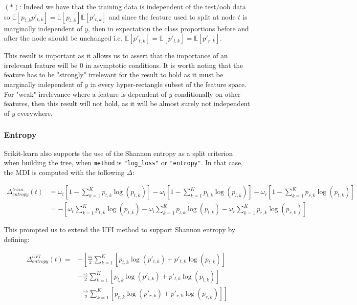 \documentclass{article}
\begin{document}
$(*)$: Indeed we have that the training data is independent of the test/oob data so $\mathbb{E}[p_{t,k}p'_{t,k}] = \mathbb{E}[p_{t,k}] \mathbb{E}[p'_{t,k}] $ and since the feature used to split at node $t$ is marginally independent of $y$, then in expectation the class proportions before and after the node should be unchanged i.e. $\mathbb{E}[p'_{t,k}] = \mathbb{E}[p'_{l,k}] = \mathbb{E}[p'_{r,k}]$.

This result is important as it allows us to assert that the importance of an irrelevant feature will be 0 in asymptotic conditions. It is worth noting that the feature has to be "strongly" irrelevant for the result to hold as it must be marginally independent of $y$ in every hyper-rectangle subset of the feature space. For "weak" irrelevance where a feature is dependent of $y$ conditionally on other features, then this result will not hold, as it will be almost surely not independent of $y$ everywhere. 


\subsubsection{Entropy}
Scikit-learn also supports the use of the Shannon entropy as a split criterion when building the tree, when \texttt{method} is \texttt{"log\_loss"} or \texttt{"entropy"}. In that case, the MDI is computed with the following $\Delta$:

 
 \begin{align*}
    \Delta_{entropy}^{train} (t) & = \omega_t \left[ 1 - \sum_{k = 1}^K p_{t,k}\log(p_{t,k})\right] - \omega_{l} \left[1 - \sum_{k = 1}^K p_{l,k}\log(p_{l,k})\right] - \omega_{r} \left[1 - \sum_{k = 1}^K p_{r,k}\log(p_{t,k})\right]\\
    & = - \left[\omega_t \sum_{k = 1}^K p_{t,k}\log(p_{t,k}) - \omega_{l} \sum_{k = 1}^K p_{l,k}\log(p_{l,k}) - \omega_{r} \sum_{k = 1}^K p_{r,k}\log(p_{r,k})\right]
 \end{align*}
 

This prompted us to extend the UFI method to support Shannon entropy by defining:

 
 \begin{align*}
    \Delta_{entropy}^{UFI} (t) = &- \left[\frac{\omega_t}{2} \sum_{k = 1}^K [p_{t,k}\log(p'_{t,k}) + p'_{t,k}\log(p_{t,k})] \right. \\ 
    &- \frac{\omega_l}{2} \sum_{k = 1}^K [p_{l,k}\log(p'_{l,k}) + p'_{l,k}\log(p_{l,k})] \\
    &-  \left. \frac{\omega_r}{2} \sum_{k = 1}^K [p_{r,k}\log(p'_{r,k}) + p'_{r,k}\log(p_{r,k})] \right]
 \end{align*}
\end{document}
